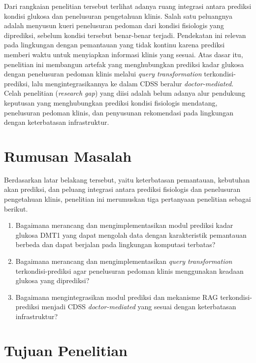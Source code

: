 Dari rangkaian penelitian tersebut terlihat adanya ruang integrasi antara prediksi kondisi glukosa dan penelusuran pengetahuan klinis. Salah satu peluangnya adalah menyusun
kueri penelusuran pedoman dari kondisi fisiologis yang diprediksi, sebelum kondisi tersebut benar-benar terjadi. Pendekatan ini relevan pada lingkungan dengan pemantauan
yang tidak kontinu karena prediksi memberi waktu untuk menyiapkan informasi klinis yang sesuai. Atas dasar itu, penelitian ini membangun artefak yang menghubungkan
prediksi kadar glukosa dengan penelusuran pedoman klinis melalui \textit{query transformation} terkondisi-prediksi, lalu mengintegrasikannya ke dalam CDSS beralur
\textit{doctor-mediated}. Celah penelitian (\textit{research gap}) yang diisi adalah belum adanya alur pendukung keputusan yang menghubungkan prediksi kondisi fisiologis
mendatang, penelusuran pedoman klinis, dan penyusunan rekomendasi pada lingkungan dengan keterbatasan infrastruktur.

\section{Rumusan Masalah}
\label{sec:bab1-rumusan-masalah}

Berdasarkan latar belakang tersebut, yaitu keterbatasan pemantauan, kebutuhan akan prediksi, dan peluang integrasi antara prediksi fisiologis dan penelusuran pengetahuan
klinis, penelitian ini merumuskan tiga pertanyaan penelitian sebagai berikut.

\begin{enumerate}
    \item Bagaimana merancang dan mengimplementasikan modul prediksi kadar glukosa DMT1 yang dapat mengolah data dengan karakteristik pemantauan berbeda dan dapat berjalan
    pada lingkungan komputasi terbatas?
    \item Bagaimana merancang dan mengimplementasikan \textit{query transformation} terkondisi-prediksi agar penelusuran pedoman klinis menggunakan keadaan glukosa yang 
    diprediksi?
    \item Bagaimana mengintegrasikan modul prediksi dan mekanisme RAG terkondisi-prediksi menjadi CDSS \textit{doctor-mediated} yang sesuai dengan keterbatasan infrastruktur?
\end{enumerate}

\section{Tujuan Penelitian}
\label{sec:bab1-tujuan}


